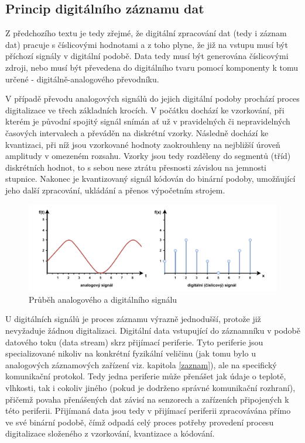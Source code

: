 \subsection{Princip digitálního záznamu dat}
Z předchozího textu je tedy zřejmé, že digitální zpracování dat (tedy i záznam dat) pracuje s číslicovými hodnotami a z toho plyne, že již na vstupu musí být příchozí signály v digitální podobě. Data tedy musí být generována číslicovými zdroji, nebo musí být převedena do digitálního tvaru pomocí komponenty k tomu určené - digitálně-analogového převodníku. 

V případě převodu analogových signálů do jejich digitální podoby prochází proces digitalizace ve třech základních krocích. V počátku dochází ke vzorkování, při kterém je původní spojitý signál snímán ať už v pravidelných či nepravidelných časových intervalech a převáděn na diskrétní vzorky. Následně dochází ke kvantizaci, při níž jsou vzorkované hodnoty zaokrouhleny na nejbližší úroveň amplitudy v omezeném rozsahu. Vzorky jsou tedy rozděleny do segmentů (tříd) diskrétních hodnot, to s sebou nese ztrátu přesnosti závislou na jemnosti stupnice. Nakonec je kvantizovaný signál kódován do binární podoby, umožňující jeho další zpracování, ukládání a přenos výpočetním strojem.

\begin{figure}[h]
    \centering
    \includegraphics[width=1.00\textwidth]{obrazky-figures/digital_vs_analog.pdf}
    \caption{Průběh analogového a digitálního signálu}
    \label{fig:digital-vs-analog}
\end{figure}

U digitálních signálů je proces záznamu výrazně jednodušší, protože již nevyžaduje žádnou digitalizaci. Digitální data vstupující do záznamníku v podobě datového toku (data stream) skrz přijímací periferie. Tyto periferie jsou specializované nikoliv na konkrétní fyzikální veličinu (jak tomu bylo u analogových záznamových zařízení viz. kapitola \ref{zaznam}), ale na specifický komunikační protokol. Tedy jedna periferie může přenášet jak údaje o teplotě, vlhkosti, tak i cokoliv jiného (pokud je dodrženo správné komunikační rozhraní), přičemž povaha přenášených dat závisí na senzorech a zařízeních připojených k této periferii. Přijímaná data jsou tedy v přijímací periferii zpracovávána přímo ve své binární podobě, čímž odpadá celý proces potřeby provedení procesu digitalizace složeného z vzorkování, kvantizace a kódování. 

